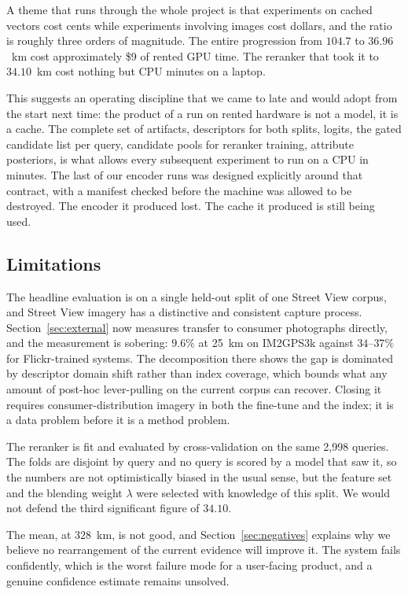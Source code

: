 \documentclass[11pt,a4paper]{article}
\begin{document}
A theme that runs through the whole project is that experiments on cached vectors cost cents while
experiments involving images cost dollars, and the ratio is roughly three orders of magnitude.
The entire progression from $104.7$ to $36.96$~km cost approximately \$9 of rented GPU time.
The reranker that took it to $34.10$~km cost nothing but CPU minutes on a laptop.

This suggests an operating discipline that we came to late and would adopt from the start next
time: the product of a run on rented hardware is not a model, it is a cache. The complete set
of artifacts, descriptors for both splits, logits, the gated candidate list per query,
candidate pools for reranker training, attribute posteriors, is what allows every subsequent
experiment to run on a CPU in minutes. The last of our encoder runs was designed explicitly
around that contract, with a manifest checked before the machine was allowed to be destroyed.
The encoder it produced lost. The cache it produced is still being used.

\subsection{Limitations}
\label{sec:limitations}

The headline evaluation is on a single held-out split of one Street View corpus, and Street
View imagery has a distinctive and consistent capture process. Section~\ref{sec:external}
now measures transfer to consumer photographs directly, and the measurement is sobering:
$9.6\%$ at 25~km on IM2GPS3k against $34$--$37\%$ for Flickr-trained systems. The
decomposition there shows the gap is dominated by descriptor domain shift rather than index
coverage, which bounds what any amount of post-hoc lever-pulling on the current corpus can
recover. Closing it requires consumer-distribution imagery in both the fine-tune and the
index; it is a data problem before it is a method problem.

The reranker is fit and evaluated by cross-validation on the same 2{,}998 queries. The folds
are disjoint by query and no query is scored by a model that saw it, so the numbers are not
optimistically biased in the usual sense, but the feature set and the blending weight
$\lambda$ were selected with knowledge of this split. We would not defend the third
significant figure of $34.10$.

The mean, at $328$~km, is not good, and Section~\ref{sec:negatives} explains why we believe no
rearrangement of the current evidence will improve it. The system fails confidently, which is
the worst failure mode for a user-facing product, and a genuine confidence estimate remains
unsolved.
\end{document}
